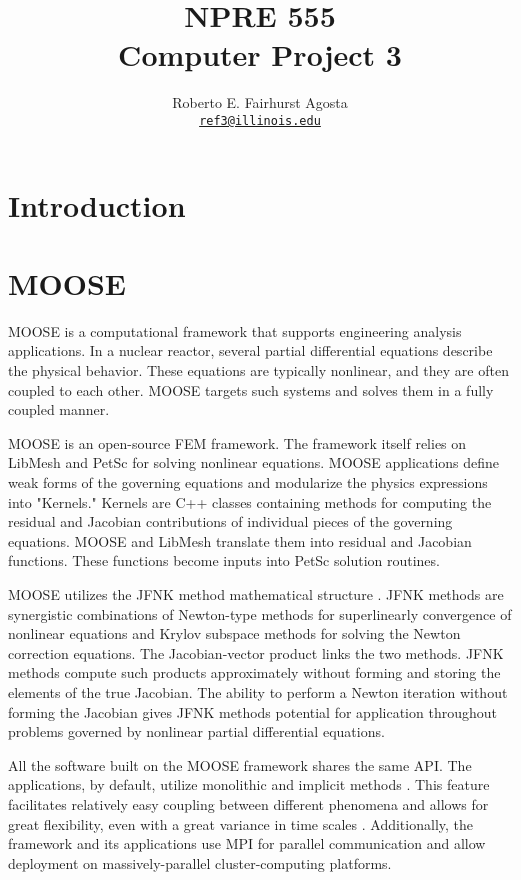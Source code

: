 \documentclass[letterpaper]{article}
\author{Roberto E. Fairhurst Agosta
        \\ \href{mailto:ref3@illinois.edu}{\texttt{ref3@illinois.edu}}
}
\title{NPRE 555\\ Computer Project 3}
\begin{document}
\begin{titlepage}
\maketitle
\thispagestyle{empty}
\end{titlepage}

\section{Introduction}

\section{MOOSE}

MOOSE \cite{gaston_moose_2009} is a computational framework that supports engineering analysis applications.
In a nuclear reactor, several partial differential equations describe the physical behavior.
These equations are typically nonlinear, and they are often coupled to each other.
\gls{MOOSE} targets such systems and solves them in a fully coupled manner.

\gls{MOOSE} is an open-source FEM framework.
The framework itself relies on LibMesh \cite{kirk_libmesh_2006} and PetSc \cite{balay_petsc_2016} for solving nonlinear equations.
MOOSE applications define weak forms of the governing equations and modularize the physics expressions into "Kernels."
Kernels are C++ classes containing methods for computing the residual and Jacobian contributions of individual pieces of the governing equations.
\gls{MOOSE} and LibMesh translate them into residual and Jacobian functions.
These functions become inputs into PetSc solution routines.

\gls{MOOSE} utilizes the \gls{JFNK} method \cite{knoll_jacobian-free_2004} mathematical structure \cite{gaston_moose_2009}.
\gls{JFNK} methods are synergistic combinations of Newton-type methods for superlinearly convergence of nonlinear equations and Krylov subspace methods for solving the Newton correction equations.
The Jacobian-vector product links the two methods.
JFNK methods compute such products approximately without forming and storing the elements of the true Jacobian.
The ability to perform a Newton iteration without forming the Jacobian gives JFNK methods potential for application throughout problems governed by nonlinear partial differential equations.

All the software built on the MOOSE framework shares the same \gls{API}.
The applications, by default, utilize monolithic and implicit methods \cite{lindsay_introduction_2018}.
This feature facilitates relatively easy coupling between different phenomena and allows for great flexibility, even with a great variance in time scales \cite{novak_pronghorn_2018}.
Additionally, the framework and its applications use \gls{MPI} for parallel communication and allow deployment on massively-parallel cluster-computing platforms.
\end{document}

